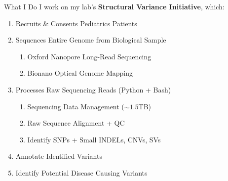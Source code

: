\documentclass[aspectratio=169,xcolor=dvipsnames]{beamer}
\begin{document}
\begin{frame}{What I Do}
    I work on my lab's \textbf{Structural Variance Initiative}, which:
    \begin{enumerate}
        \item Recruits \& Consents Pediatrics Patients
        \item Sequences Entire Genome from Biological Sample
        \begin{enumerate}
            \item Oxford Nanopore Long-Read Sequencing 
            \item Bionano Optical Genome Mapping
        \end{enumerate}
        \item Processes Raw Sequencing Reads (Python + Bash)
        \begin{enumerate}
            \item Sequencing Data Management ($\sim1.5$TB)
            \item Raw Sequence Alignment + QC
            \item Identify SNPs + Small INDELs, CNVs, SVs
        \end{enumerate}
        \item Annotate Identified Variants
        \item Identify Potential Disease Causing Variants
    \end{enumerate}


\end{frame}
\end{document}
